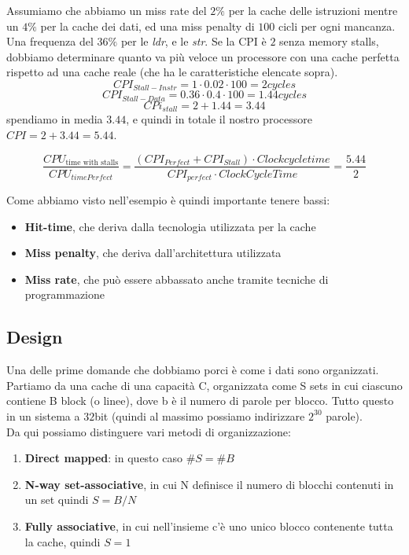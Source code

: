 \begin{example}
    Assumiamo che abbiamo un miss rate del \(2\%\) per la cache delle istruzioni mentre un \(4\%\) per la cache dei dati, ed una miss penalty di $100$ cicli per ogni mancanza. Una frequenza del \(36\%\) per le \emph{ldr}, e le \emph{str}. Se la CPI è $2$ senza memory stalls, dobbiamo determinare quanto va più veloce un processore con una cache perfetta rispetto ad una cache reale (che ha le caratteristiche elencate sopra).\\

    \[CPI_{Stall-Instr} = 1 \cdot 0.02 \cdot 100 = 2 cycles\]
    \[CPI_{Stall-Data} = 0.36 \cdot 0.4 \cdot 100 = 1.44 cycles\]
    \[CPi_{stall} = 2 + 1.44 = 3.44\]
    spendiamo in media $3.44$, e quindi in totale il nostro processore $CPI = 2 + 3.44 = 5.44$.

    \[\frac{CPU_{\text{time with stalls}}}{CPU_{time Perfect}} = \frac{(CPI_{Perfect} + CPI_{Stall}) \cdot Clockcycletime}{CPI_{perfect} \cdot ClockCycleTime} =  \frac{5.44}{2}\]
\end{example}

Come abbiamo visto nell'esempio è quindi importante tenere bassi:
\begin{itemize}
	\item \textbf{Hit-time}, che deriva dalla tecnologia utilizzata per la cache
    \item \textbf{Miss penalty}, che deriva dall'architettura utilizzata
    \item \textbf{Miss rate}, che può essere abbassato anche tramite tecniche di programmazione
\end{itemize}

\subsection{Design}
Una delle prime domande che dobbiamo porci è come i dati sono organizzati.\\
Partiamo da una cache di una capacità C, organizzata come S sets in cui ciascuno contiene B block (o linee), dove b è il numero di parole per blocco. Tutto questo in un sistema a $32$bit (quindi al massimo possiamo indirizzare $2^{30}$ parole).\\
Da qui possiamo distinguere vari metodi di organizzazione:
\begin{enumerate}
    \item \textbf{Direct mapped}: in questo caso $\#S=\#B$
    \item \textbf{N-way set-associative}, in cui N definisce il numero di blocchi contenuti in un set quindi $S=B/N$
    \item \textbf{Fully associative}, in cui nell'insieme c'è uno unico blocco contenente tutta la cache, quindi $S=1$
\end{enumerate}

